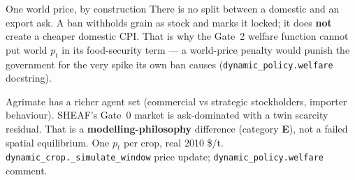 \begin{frame}{One world price, by construction}
There is no split between a domestic and an export ask. A ban withholds
grain as stock and marks it locked; it does \textbf{not} create a cheaper
domestic CPI. That is why the Gate~2 welfare function cannot put world
$p_t$ in its food-security term --- a world-price penalty would punish the
government for the very spike its own ban causes
(\texttt{dynamic\_policy.welfare} docstring).

Agrimate has a richer agent set (commercial vs strategic stockholders,
importer behaviour). SHEAF's Gate~0 market is ask-dominated with a twin
scarcity residual. That is a \textbf{modelling-philosophy} difference
(category \textbf{E}), not a failed spatial equilibrium.
{One $p_t$ per crop, real 2010 \$/t.}
{\texttt{dynamic\_crop.\_simulate\_window} price update;
\texttt{dynamic\_policy.welfare} comment.}
\end{frame}
